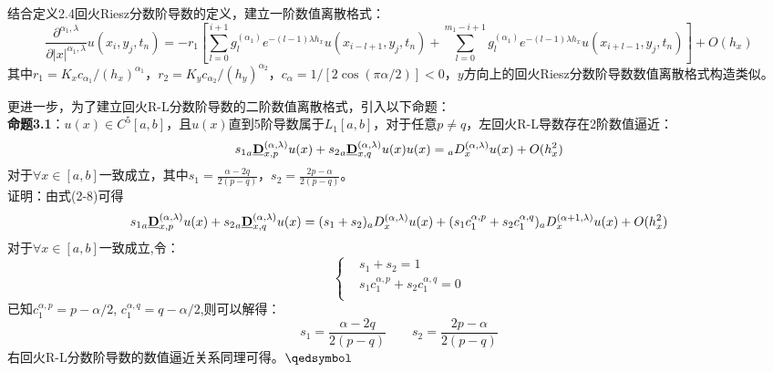 \documentclass[twoside,UTF8]{nputhesis}
\begin{document}
结合定义2.4回火Riesz分数阶导数的定义，建立一阶数值离散格式：
\begin{equation}
\frac{\partial^{\alpha_{1}, \lambda}}{\partial|x|^{\alpha_{1}, \lambda}} u\left(x_{i}, y_{j}, t_{n}\right)=-r_{1}\left[\sum_{l=0}^{i+1} g_{l}^{(\alpha_{1})}{{e}^{-(l-1)\lambda {h}_{x}}} u\left(x_{i-l+1}, y_{j}, t_{n}\right)+\sum_{l=0}^{m_{1}-i+1} g_{l}^{(\alpha_{1})
}{{e}^{-(l-1)\lambda {h}_{x}}} u\left(x_{i+l-1}, y_{j}, t_{n}\right)\right]+O\left(h_{x}\right)
\end{equation}
其中${{r}_{1}}={{K}_{x}}{{c}_{{{\alpha }_{1}}}}/{{({{h}_{x}})}^{{{\alpha }_{1}}}}$，${{r}_{2}}={{K}_{y}}{{c}_{{{\alpha }_{2}}}}/{{({{h}_{y}})}^{{{\alpha }_{2}}}}$，${{c}_{\alpha }}=1/[2\cos (\pi \alpha /2)]<0$，$y$方向上的回火Riesz分数阶导数数值离散格式构造类似。

更进一步，为了建立回火R-L分数阶导数的二阶数值离散格式，引入以下命题：\\
\noindent
\textbf{命题3.1}：$u(x)\in {{C}^{5}}[a,b]$，且$u(x)$直到5阶导数属于${{L}_{1}}[a,b]$，对于任意$p\ne q$，左回火R-L导数存在2阶数值逼近：
\begin{equation}
\begin{split}
{{s}_{1}}_{a}\emph{\textbf{D}}_{x,p}^{(\alpha ,\lambda )}u(x)+{{s}_{2}}_{a}\emph{\textbf{D}}_{x,q}^{(\alpha ,\lambda )}u(x)u(x)={}_{a}D_{x}^{(\alpha ,\lambda )}u(x)+O({h_{x}^{2}})
\end{split}
\end{equation}
对于$\forall x\in[a,b]$一致成立，其中${{s}_{1}}=\frac{\alpha -2q}{2(p-q)}$，${{s}_{2}}=\frac{2p-\alpha }{2(p-q)}$。\\
证明：由式(2-8)可得
\[
\begin{split}
& {{s}_{1}}_{a}\emph{\textbf{D}}_{x,p}^{(\alpha ,\lambda )}u(x)+{{s}_{2}}_{a}\emph{\textbf{D}}_{x,q}^{(\alpha ,\lambda )}u(x)
=({{s}_{1}}+{{s}_{2}}){}_{a}D_{x}^{(\alpha ,\lambda )}u(x)+({{s}_{1}}c_{1}^{\alpha ,p}+{{s}_{2}}c_{1}^{\alpha ,q}){}_{a}D_{x}^{(\alpha +1,\lambda )}u(x)+O({h_{x}^{2}}) \\
\end{split}
\]
对于$\forall x\in[a,b]$一致成立,令：
\[\left\{ \begin{split}
& {{s}_{1}}+{{s}_{2}}=1 \\
& {{s}_{1}}c_{1}^{\alpha ,p}+{{s}_{2}}c_{1}^{\alpha ,q}=0 \\
\end{split} \right.\]
已知$c_{1}^{\alpha ,p}=p-\alpha /2$, $c_{1}^{\alpha ,q}=q-\alpha /2$,则可以解得：
\[{{s}_{1}}=\frac{\alpha -2q}{2(p-q)} \qquad  {{s}_{2}}=\frac{2p-\alpha }{2(p-q)}\]
右回火R-L分数阶导数的数值逼近关系同理可得。$\hfill\qedsymbol$\\     %
\end{document}

